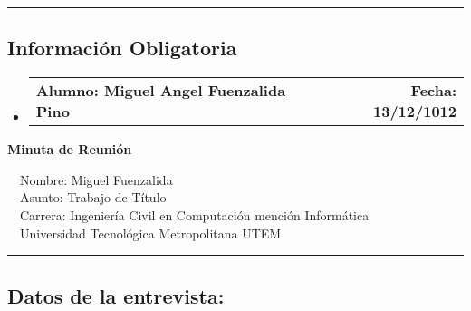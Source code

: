 \documentclass[10pt,letterpaper]{article}
\makeatletter
\newcommand{\headerrow}[2]
{\begin{tabular*}{\linewidth}{l@{\extracolsep{\fill}}r}
	#1 &
	#2 \\
\end{tabular*}}
\makeatother
\begin{document}
\hrule
\vspace{-0.4em}
\subsection*{Información Obligatoria}

\begin{itemize}
	\parskip=0.1em

	\item 
	\headerrow
		{\textbf{Alumno: Miguel Angel Fuenzalida Pino}}
		{\textbf{Fecha: 13/12/1012}}

\end{itemize}
\newpage
\begin{center}
{\LARGE \textbf{Minuta de Reunión}}

\ \ \textbullet Nombre: Miguel Fuenzalida
\\
\ \ \textbullet Asunto: Trabajo de Título
\\
\ \ \textbullet Carrera: Ingeniería Civil en Computación mención Informática
\\
\ \ \textbullet Universidad Tecnológica Metropolitana UTEM
\end{center}

\hrule
\vspace{-0.4em}
\subsection*{Datos de la entrevista:}
\end{document}
